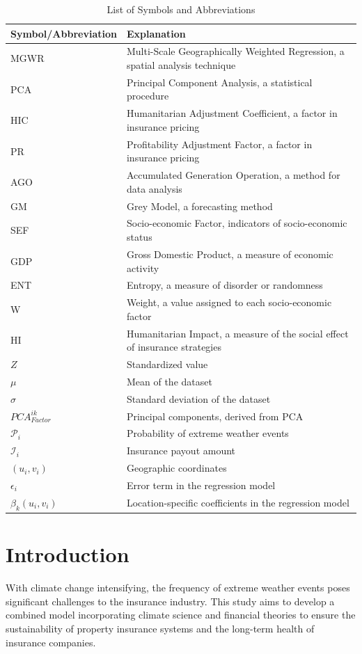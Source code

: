 \documentclass[12pt]{article}
\begin{document}
\begin{table}[ht]
\centering
\caption{List of Symbols and Abbreviations}
\label{sy}
\begin{tabular}{ll}
\toprule[1.2pt]
Symbol/Abbreviation & Explanation \\
\hline
MGWR & Multi-Scale Geographically Weighted Regression, a spatial analysis technique \\
PCA & Principal Component Analysis, a statistical procedure \\
HIC & Humanitarian Adjustment Coefficient, a factor in insurance pricing \\
PR & Profitability Adjustment Factor, a factor in insurance pricing \\
AGO & Accumulated Generation Operation, a method for data analysis \\
GM & Grey Model, a forecasting method \\
SEF & Socio-economic Factor, indicators of socio-economic status \\
GDP & Gross Domestic Product, a measure of economic activity \\
ENT & Entropy, a measure of disorder or randomness \\
W & Weight, a value assigned to each socio-economic factor \\
HI & Humanitarian Impact, a measure of the social effect of insurance strategies \\
$Z$ & Standardized value \\
$\mu$ & Mean of the dataset \\
$\sigma$ & Standard deviation of the dataset \\
$PCA_{Factor}^{ik}$ & Principal components, derived from PCA \\
$\mathcal{P}_i$ & Probability of extreme weather events \\
$\mathcal{I}_i$ & Insurance payout amount \\
$(u_i, v_i)$ & Geographic coordinates \\
$\epsilon_i$ & Error term in the regression model \\
$\beta_k\left(u_i, v_i\right)$ & Location-specific coefficients in the regression model \\
\bottomrule[1.2pt]
\end{tabular}
\end{table}

\section{Introduction}
With climate change intensifying, the frequency of extreme weather events poses significant challenges to the insurance industry. This study aims to develop a combined model incorporating climate science and financial theories to ensure the sustainability of property insurance systems and the long-term health of insurance companies.
\end{document}
